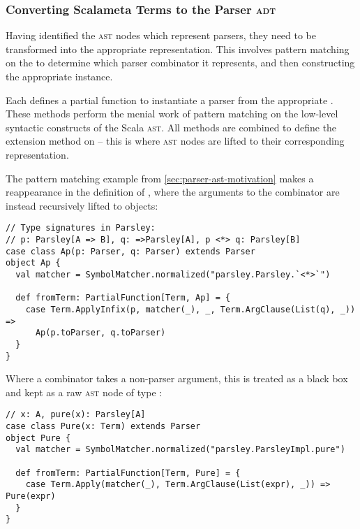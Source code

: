 \documentclass[../../main.tex]{subfiles}
\begin{document}

\subsubsection{Converting Scalameta Terms to the Parser \textsc{adt}}
Having identified the \textsc{ast} nodes which represent parsers, they need to be transformed into the appropriate  representation.
This involves pattern matching on the  to determine which parser combinator it represents, and then constructing the appropriate  instance.

Each  defines a partial function  to instantiate a parser from the appropriate .
These  methods perform the menial work of pattern matching on the low-level syntactic constructs of the Scala \textsc{ast}.
All  methods are combined to define the  extension method on  -- this is where \textsc{ast} nodes are lifted to their corresponding  representation.

The pattern matching example from \cref{sec:parser-ast-motivation} makes a reappearance in the definition of , where the arguments to the \scala{<*>} combinator are instead recursively lifted to  objects:
\begin{verbatim}
// Type signatures in Parsley:
// p: Parsley[A => B], q: =>Parsley[A], p <*> q: Parsley[B]
case class Ap(p: Parser, q: Parser) extends Parser
object Ap {
  val matcher = SymbolMatcher.normalized("parsley.Parsley.`<*>`")

  def fromTerm: PartialFunction[Term, Ap] = {
    case Term.ApplyInfix(p, matcher(_), _, Term.ArgClause(List(q), _)) =>
      Ap(p.toParser, q.toParser)
  }
}
\end{verbatim}
%
Where a combinator takes a non-parser argument, this is treated as a black box and kept as a raw \textsc{ast} node of type :
\begin{verbatim}
// x: A, pure(x): Parsley[A]
case class Pure(x: Term) extends Parser
object Pure {
  val matcher = SymbolMatcher.normalized("parsley.ParsleyImpl.pure")

  def fromTerm: PartialFunction[Term, Pure] = {
    case Term.Apply(matcher(_), Term.ArgClause(List(expr), _)) => Pure(expr)
  }
}
\end{verbatim}
\end{document}
